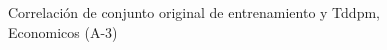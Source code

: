 \begin{figure}[H]
    \centering
    
    \caption{Correlación de conjunto original de entrenamiento y Tddpm, Economicos (A-3)}
    \label{pairwise-economicos-a-3-tddpm_mlp}
\end{figure}